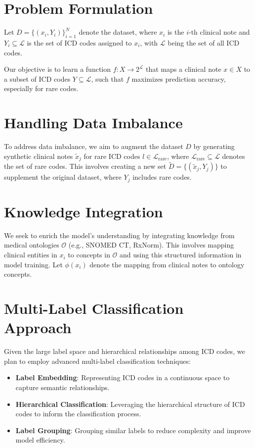 \documentclass[12pt,a4paper]{report}
\begin{document}
\section{Problem Formulation}
Let \( D = \{(x_i, Y_i)\}_{i=1}^N \) denote the dataset, where \( x_i \) is the \( i \)-th clinical note and \( Y_i \subseteq \mathcal{L} \) is the set of ICD codes assigned to \( x_i \), with \( \mathcal{L} \) being the set of all ICD codes.

Our objective is to learn a function \( f: X \rightarrow 2^{\mathcal{L}} \) that maps a clinical note \( x \in X \) to a subset of ICD codes \( Y \subseteq \mathcal{L} \), such that \( f \) maximizes prediction accuracy, especially for rare codes.

\section{Handling Data Imbalance}
To address data imbalance, we aim to augment the dataset \( D \) by generating synthetic clinical notes \( \tilde{x}_j \) for rare ICD codes \( l \in \mathcal{L}_{\text{rare}} \), where \( \mathcal{L}_{\text{rare}} \subseteq \mathcal{L} \) denotes the set of rare codes. This involves creating a new set \( \tilde{D} = \{(\tilde{x}_j, Y_j)\} \) to supplement the original dataset, where \( Y_j \) includes rare codes.

\section{Knowledge Integration}
We seek to enrich the model's understanding by integrating knowledge from medical ontologies \( \mathcal{O} \) (e.g., SNOMED CT, RxNorm). This involves mapping clinical entities in \( x_i \) to concepts in \( \mathcal{O} \) and using this structured information in model training. Let \( \phi(x_i) \) denote the mapping from clinical notes to ontology concepts.

\section{Multi-Label Classification Approach}
Given the large label space and hierarchical relationships among ICD codes, we plan to employ advanced multi-label classification techniques:
\begin{itemize}
    \item \textbf{Label Embedding}: Representing ICD codes in a continuous space to capture semantic relationships.
    \item \textbf{Hierarchical Classification}: Leveraging the hierarchical structure of ICD codes to inform the classification process.
    \item \textbf{Label Grouping}: Grouping similar labels to reduce complexity and improve model efficiency.
\end{itemize}
\end{document}
